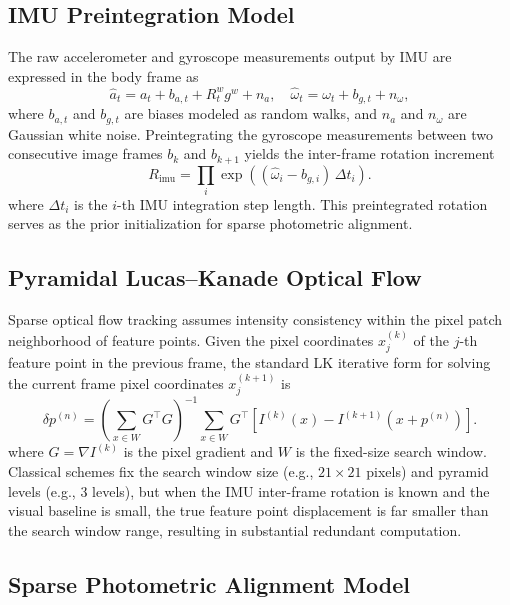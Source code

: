 \documentclass[journal,twoside,web]{ieeecolor}
\begin{document}
\subsection{IMU Preintegration Model}

The raw accelerometer and gyroscope measurements output by IMU are expressed in the body frame as
\begin{equation}
\hat{a}_{t} = a_{t} + b_{a,t} + R_{t}^{w} g^{w} + n_{a},\quad
\hat{\omega}_{t} = \omega_{t} + b_{g,t} + n_{\omega},
\label{eq:imu_meas}
\end{equation}
where $b_{a,t}$ and $b_{g,t}$ are biases modeled as random walks, and $n_{a}$ and $n_{\omega}$ are Gaussian white noise. Preintegrating the gyroscope measurements between two consecutive image frames $b_{k}$ and $b_{k+1}$ yields the inter-frame rotation increment
\begin{equation}
R_{\mathrm{imu}} = \prod_{i} \exp\!\left((\hat{\omega}_{i} - b_{g,i})\, \Delta t_{i} \right).
\label{eq:imu_preint}
\end{equation}
where $\Delta t_{i}$ is the $i$-th IMU integration step length. This preintegrated rotation serves as the prior initialization for sparse photometric alignment.

\subsection{Pyramidal Lucas--Kanade Optical Flow}

Sparse optical flow tracking assumes intensity consistency within the pixel patch neighborhood of feature points. Given the pixel coordinates $x_{j}^{(k)}$ of the $j$-th feature point in the previous frame, the standard LK iterative form for solving the current frame pixel coordinates $x_{j}^{(k+1)}$ is
\begin{equation}
\delta p^{(n)} = \left( \sum_{x\in W} G^{\top} G \right)^{-1}
\!\!\sum_{x\in W} G^{\top}\!\left[ I^{(k)}(x) - I^{(k+1)}(x + p^{(n)}) \right].
\label{eq:lk}
\end{equation}
where $G = \nabla I^{(k)}$ is the pixel gradient and $W$ is the fixed-size search window. Classical schemes fix the search window size (e.g., $21 \times 21$ pixels) and pyramid levels (e.g., 3 levels), but when the IMU inter-frame rotation is known and the visual baseline is small, the true feature point displacement is far smaller than the search window range, resulting in substantial redundant computation.

\subsection{Sparse Photometric Alignment Model}
\end{document}
